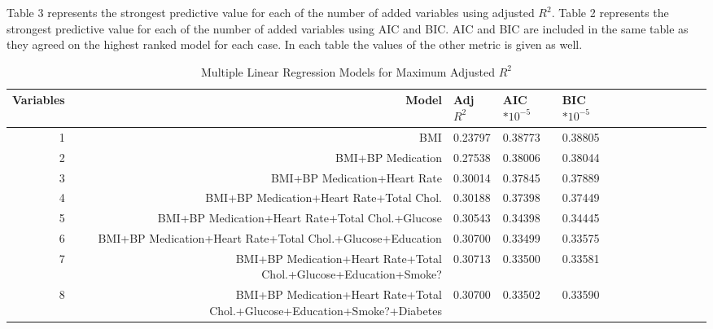 \documentclass{article}\usepackage[]{graphicx}\usepackage[]{color}
\begin{document}
Table 3 represents the strongest predictive value for each of the number of added variables using adjusted $R^2$. Table 2 represents the strongest predictive value for each of the number of added variables using AIC and BIC.  AIC and BIC are included in the same table as they agreed on the highest ranked model for each case. In each table the values of the other metric is given as well. 

 



\begin{table}[ht]
\begin{tiny}
\centering
\begin{tabular}{rrllllllllrrr}
  \hline
Variables & Model & Adj $R^2$ & AIC$*10^{-5}$ & BIC$*10^{-5}$ \\ 
  \hline
        1 & BMI & 0.23797 & 0.38773 & 0.38805 \\ 
     2 & BMI+BP Medication & 0.27538 & 0.38006 & 0.38044 \\ 
     3 & BMI+BP Medication+Heart Rate & 0.30014 & 0.37845 & 0.37889 \\ 
     4 & BMI+BP Medication+Heart Rate+Total Chol. & 0.30188 & 0.37398 & 0.37449 \\ 
     5 & BMI+BP Medication+Heart Rate+Total Chol.+Glucose& 0.30543 & 0.34398 & 0.34445 \\ 
     6 & BMI+BP Medication+Heart Rate+Total Chol.+Glucose+Education& 0.30700 & 0.33499 & 0.33575 \\ 
     7 & BMI+BP Medication+Heart Rate+Total Chol.+Glucose+Education+Smoke?& 0.30713 & 0.33500 & 0.33581 \\ 
     8 & BMI+BP Medication+Heart Rate+Total Chol.+Glucose+Education+Smoke?+Diabetes& 0.30700 & 0.33502 & 0.33590 \\  
   \hline
   \end{tabular}
\caption{Multiple Linear Regression Models for Maximum Adjusted $R^2$}
\end{tiny}
\end{table}
\end{document}
